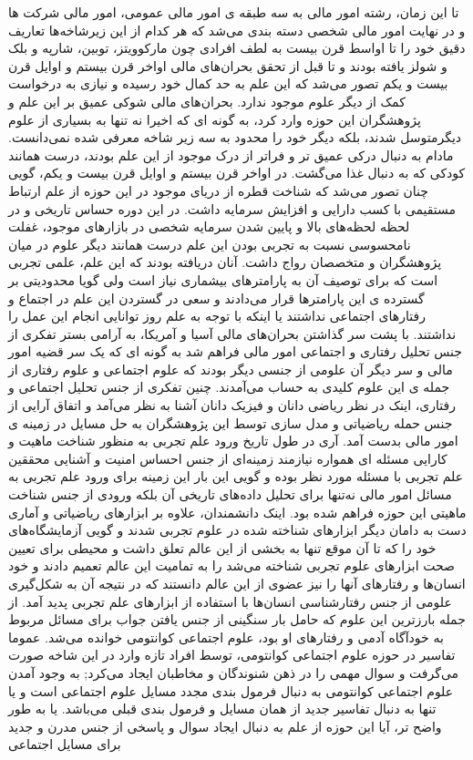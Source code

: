 \documentclass[a4paper,titlepage,12pt,fleqn,oneside]{report}
\begin{document}
	
	تا این زمان، رشته امور مالی به سه طبقه ی امور مالی عمومی، امور مالی شرکت ها و در نهایت امور مالی شخصی دسته بندی می‌شد که هر کدام از این زیرشاخه‌ها تعاریف دقیق خود را تا اواسط قرن بیست به لطف افرادی چون مارکوویتز، توبین، شارپه و بلک و شولز یافته بودند و تا قبل از تحقق بحران‌های مالی اواخر قرن بیستم و اوایل قرن بیست و یکم تصور می‌شد که این علم به حد کمال خود رسیده و نیازی به درخواست کمک از دیگر علوم موجود ندارد. بحران‌های مالی شوکی عمیق بر این علم و پژوهشگران این حوزه وارد کرد، به گونه ای که اخیرا نه تنها به بسیاری از علوم دیگرمتوسل شدند، بلکه دیگر خود را محدود به سه زیر شاخه معرفی شده نمی‌دانست. مادام به دنبال درکی عمیق تر و فراتر از درک موجود از این علم بودند، درست همانند کودکی که به دنبال غذا می‌گشت. در اواخر قرن بیستم و اوایل قرن بیست و یکم، گویی چنان تصور می‌شد که شناخت قطره از دریای موجود در این حوزه از علم ارتباط مستقیمی با کسب دارایی و افزایش سرمایه داشت. در این دوره حساس تاریخی و در لحظه لحظه‌های بالا و پایین شدن سرمایه شخصی در بازارهای موجود، غفلت نامحسوسی نسبت به تجربی بودن این علم درست همانند دیگر علوم در میان پژوهشگران و متخصصان رواج داشت. آنان دریافته بودند که این علم، علمی تجربی است که برای توصیف آن به پارامترهای بیشماری نیاز است ولی گویا محدودیتی بر گسترده ی این پارامترها قرار می‌دادند و سعی در گستردن این علم در اجتماع و رفتارهای اجتماعی نداشتند یا اینکه با توجه به علم روز توانایی انجام این عمل را نداشتند. با پشت سر گذاشتن بحران‌های مالی آسیا و آمریکا، به آرامی بستر تفکری از جنس تحلیل رفتاری و اجتماعی امور مالی فراهم شد به گونه ای که یک سر قضیه امور مالی و سر دیگر آن علومی از جنسی دیگر بودند که علوم اجتماعی و علوم رفتاری از جمله ی این علوم کلیدی به حساب می‌آمدند. چنین تفکری از جنس تحلیل اجتماعی و رفتاری، اینک در نظر ریاضی دانان و فیزیک دانان آشنا به نظر می‌آمد و اتفاق آرایی از جنس حمله ریاضیاتی و مدل سازی توسط این پژوهشگران به حل مسايل در زمینه ی امور مالی بدست آمد. آری در طول تاریخ ورود علم تجربی به منظور شناخت ماهیت و کارایی مسئله ای همواره نیازمند زمینه‌ای از جنس احساس امنیت و آشنایی محققین علم تجربی با مسئله مورد نظر بوده و گویی این بار این زمینه برای ورود علم تجربی به مسائل امور مالی نه‌تنها برای تحلیل داده‌های تاریخی آن بلکه ورودی از جنس شناخت ماهیتی این حوزه فراهم شده بود. اینک دانشمندان، علاوه بر ابزارهای ریاضیاتی و آماری دست به دامان دیگر ابزارهای شناخته شده در علوم تجربی شدند و گویی آزمایشگاه‌های خود را که تا آن موقع تنها به بخشی از این عالم تعلق داشت و محیطی برای تعیین صحت ابزارهای علوم تجربی شناخته می‌شد را به تمامیت این عالم تعمیم دادند و خود انسان‌ها و رفتارهای آنها را نیز عضوی از این عالم دانستند که در نتیجه آن به شکل‌گیری علومی از جنس رفتارشناسی انسان‌ها با استفاده از ابزارهای علم تجربی پدید آمد.  از جمله بارزترین این علوم که حامل بار سنگینی از جنس یافتن جواب برای مسائل مربوط به خودآگاه آدمی و رفتارهای او بود، علوم اجتماعی کوانتومی خوانده می‌شد. عموما تفاسیر در حوزه  علوم اجتماعی کوانتومی، توسط افراد تازه وارد در این شاخه صورت می‌گرفت و سوال مهمی را در ذهن شنوندگان و مخاطبان ایجاد می‌کرد; به وجود آمدن علوم اجتماعی کوانتومی به دنبال فرمول بندی مجدد مسایل علوم اجتماعی است و یا تنها به دنبال تفاسیر جدید از همان مسایل و فرمول بندی  قبلی می‌باشد. یا به طور واضح تر، آیا این حوزه از علم به دنبال ایجاد سوال و پاسخی از جنس مدرن و جدید برای مسایل اجتماعی 
\end{document}

